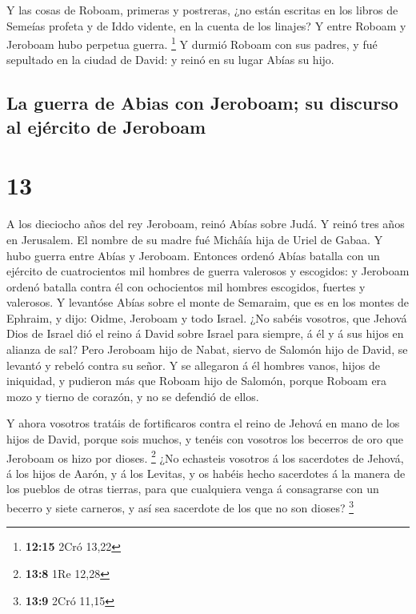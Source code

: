  Y las cosas de Roboam, primeras y postreras, ¿no están
escritas en los libros de Semeías profeta y de Iddo vidente, en la
cuenta de los linajes? Y entre Roboam y Jeroboam hubo perpetua guerra.
\footnote{\textbf{12:15} 2Cró 13,22}  Y durmió Roboam con
sus padres, y fué sepultado en la ciudad de David: y reinó en su lugar
Abías su hijo.

\hypertarget{la-guerra-de-abias-con-jeroboam-su-discurso-al-ejuxe9rcito-de-jeroboam}{%
\subsection{La guerra de Abias con Jeroboam; su discurso al ejército de
Jeroboam}\label{la-guerra-de-abias-con-jeroboam-su-discurso-al-ejuxe9rcito-de-jeroboam}}

\hypertarget{section-12}{%
\section{13}\label{section-12}}

 A los dieciocho años del rey Jeroboam, reinó Abías sobre
Judá.  Y reinó tres años en Jerusalem. El nombre de su madre
fué Michâía hija de Uriel de Gabaa. Y hubo guerra entre Abías y
Jeroboam.  Entonces ordenó Abías batalla con un ejército de
cuatrocientos mil hombres de guerra valerosos y escogidos: y Jeroboam
ordenó batalla contra él con ochocientos mil hombres escogidos, fuertes
y valerosos.  Y levantóse Abías sobre el monte de Semaraim,
que es en los montes de Ephraim, y dijo: Oidme, Jeroboam y todo Israel.
 ¿No sabéis vosotros, que Jehová Dios de Israel dió el reino
á David sobre Israel para siempre, á él y á sus hijos en alianza de sal?
 Pero Jeroboam hijo de Nabat, siervo de Salomón hijo de
David, se levantó y rebeló contra su señor.  Y se allegaron
á él hombres vanos, hijos de iniquidad, y pudieron más que Roboam hijo
de Salomón, porque Roboam era mozo y tierno de corazón, y no se defendió
de ellos.

 Y ahora vosotros tratáis de fortificaros contra el reino de
Jehová en mano de los hijos de David, porque sois muchos, y tenéis con
vosotros los becerros de oro que Jeroboam os hizo por dioses.
\footnote{\textbf{13:8} 1Re 12,28}  ¿No echasteis vosotros á
los sacerdotes de Jehová, á los hijos de Aarón, y á los Levitas, y os
habéis hecho sacerdotes á la manera de los pueblos de otras tierras,
para que cualquiera venga á consagrarse con un becerro y siete carneros,
y así sea sacerdote de los que no son dioses? \footnote{\textbf{13:9}
  2Cró 11,15}

